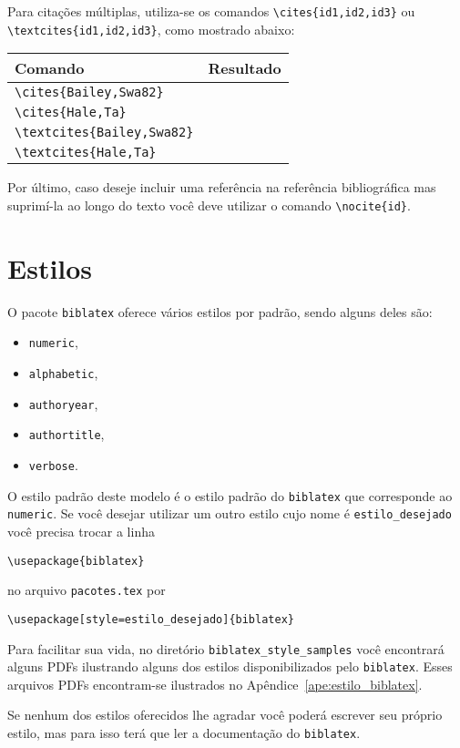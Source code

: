 Para citações múltiplas, utiliza-se os comandos \lstinline+\cites{id1,id2,id3}+
ou \lstinline+\textcites{id1,id2,id3}+, como mostrado abaixo:
\begin{table}[!h]
  \centering
  \begin{tabular}{lc}
    \toprule
    Comando & Resultado \\ \midrule
    \lstinline+\cites{Bailey,Swa82}+ & \cites{Bailey,Swa82} \\
    \lstinline+\cites{Hale,Ta}+ & \cites{Hale,Ta} \\
    \lstinline+\textcites{Bailey,Swa82}+ & \textcites{Bailey,Swa82} \\
    \lstinline+\textcites{Hale,Ta}+ & \textcites{Hale,Ta} \\ \bottomrule
  \end{tabular}
\end{table}

Por último, caso deseje incluir uma referência na referência bibliográfica mas
suprimí-la ao longo do texto você deve utilizar o comando
\lstinline+\nocite{id}+.

\section{Estilos}
O pacote \lstinline+biblatex+ oferece vários estilos por padrão, sendo alguns
deles são:
\begin{itemize}
  \item \lstinline+numeric+,
  \item \lstinline+alphabetic+,
  \item \lstinline+authoryear+,
  \item \lstinline+authortitle+,
  \item \lstinline+verbose+.
\end{itemize}

O estilo padrão deste modelo é o estilo padrão do \lstinline+biblatex+ que
corresponde ao \lstinline+numeric+. Se você desejar utilizar um outro estilo
cujo nome é \lstinline+estilo_desejado+ você precisa trocar a linha
\begin{lstlisting}
\usepackage{biblatex}
\end{lstlisting}
no arquivo \lstinline+pacotes.tex+ por
\begin{lstlisting}
\usepackage[style=estilo_desejado]{biblatex}
\end{lstlisting}

Para facilitar sua vida, no diretório \lstinline+biblatex_style_samples+ você
encontrará alguns PDFs ilustrando alguns dos estilos disponibilizados pelo
\lstinline+biblatex+. Esses arquivos PDFs encontram-se ilustrados no
Apêndice~\ref{ape:estilo_biblatex}.

Se nenhum dos estilos oferecidos lhe agradar você poderá escrever seu próprio
estilo, mas para isso terá que ler a documentação do \lstinline+biblatex+.
